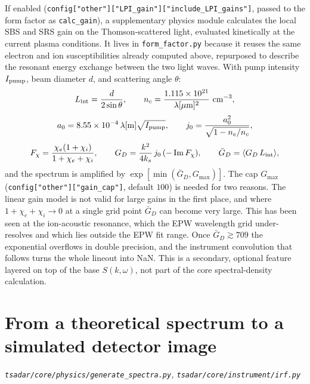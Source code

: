 \documentclass[11pt]{article}
\newcommand{\code}[1]{\texttt{#1}}
\newcommand{\file}[1]{\texttt{#1}}
\begin{document}
If enabled (\code{config["other"]["LPI\_gain"]["include\_LPI\_gains"]}, passed to the form
factor as \code{calc\_gain}), a supplementary physics module calculates the local SBS
and SRS gain on the Thomson-scattered light, evaluated kinetically at the current plasma
conditions. It lives in \file{form\_factor.py} because it reuses the same electron and ion
susceptibilities already computed above, repurposed to describe the resonant energy
exchange between the two light waves. With
pump intensity $I_{\rm pump}$, beam diameter $d$, and scattering angle $\theta$:
\begin{equation}
  L_{\rm int}=\frac{d}{2\sin\theta}, \qquad n_c=\frac{1.115\times10^{21}}{\lambda[\mu\mathrm m]^2}\ \si{cm^{-3}},
\end{equation}
\begin{equation}
  a_0 = 8.55\times10^{-4}\,\lambda[\mathrm m]\sqrt{I_{\rm pump}}, \qquad
  j_0=\frac{a_0^2}{\sqrt{1-n_e/n_c}},
\end{equation}
\begin{equation}
  F_\chi=\frac{\chi_e(1+\chi_i)}{1+\chi_e+\chi_i}, \qquad
  G_D=\frac{k^2}{4k_s}\,j_0\,(-\operatorname{Im}F_\chi), \qquad \bar G_D=\langle G_D\,L_{\rm int}\rangle,
\end{equation}
and the spectrum is amplified by $\exp[\min(\bar G_D,G_{\max})]$. The cap $G_{\max}$
(\code{config["other"]["gain\_cap"]}, default $100$) is needed for two reasons. The linear
gain model is not valid for large gains in the first place, and where
$1+\chi_e+\chi_i\to0$ at a single grid point $\bar G_D$ can become very large. This has
been seen at the ion-acoustic resonance, which the EPW wavelength grid under-resolves and
which lies outside the EPW fit range. Once $\bar G_D\gtrsim709$ the exponential overflows
in double precision, and the instrument convolution that follows turns the whole lineout
into NaN. This is a secondary, optional feature layered on top of the base $S(k,\omega)$,
not part of the core spectral-density calculation.

\section{From a theoretical spectrum to a simulated detector image}\label{sec:downstream}
\textit{\file{tsadar/core/physics/generate\_spectra.py}, \file{tsadar/core/instrument/irf.py}}
\end{document}
